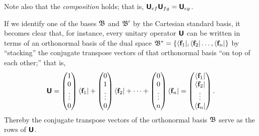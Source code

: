 Note also that the {\em composition} holds; that is, $\textsf{\textbf{U}}_{ef} \textsf{\textbf{U}}_{fg}=  \textsf{\textbf{U}}_{eg}$.



If we
identify one of the bases  ${\frak B}$ and ${\frak B}'$ by the Cartesian standard basis,
it becomes clear that, for instance,
every unitary operator  $\textsf{\textbf{U}}$  can be written in terms of an orthonormal basis
of the dual space
${\frak B}^\ast=\{ \langle {\bf f}_1  \vert     ,   \langle {\bf f}_2  \vert      \ldots ,  \langle {\bf f}_n  \vert     \}$
by ``stacking'' the conjugate transpose vectors of that orthonormal basis ``on top of each other;''
that is,
\begin{equation}
\textsf{\textbf{U}}
=
\begin{pmatrix}
1\\
0\\
\vdots\\
0
\end{pmatrix} \langle {\bf f}_1  \vert
+
\begin{pmatrix}
0\\
1\\
\vdots\\
0
\end{pmatrix}  \langle {\bf f}_2  \vert
+
\cdots +
\begin{pmatrix}
0\\
0\\
\vdots\\
n
\end{pmatrix}  \langle {\bf f}_n  \vert
=
\begin{pmatrix}
\langle {\bf f}_1\vert \\
\langle {\bf f}_2\vert\\
\vdots\\
\langle {\bf f}_n\vert
\end{pmatrix}
.
\end{equation}
Thereby the conjugate transpose vectors of the orthonormal basis  ${\frak B}$ serve as the
rows of $\textsf{\textbf{U}}$.

